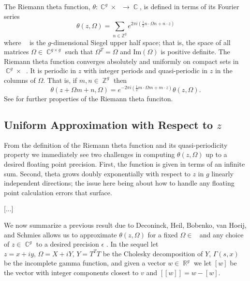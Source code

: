 \documentclass[12]{article}
\DeclareMathOperator{\ZZ}{\mathbb{Z}}
\DeclareMathOperator{\RR}{\mathbb{R}}
\DeclareMathOperator{\CC}{\mathbb{C}}
\DeclareMathOperator{\hg}{\mathfrak{h}_g}
\begin{document}
The Riemann theta function, $\theta : \CC^g \times \hg \to \CC$, is defined in
terms of its Fourier series
\[
  \theta(z,\Omega) = \sum_{n \in \mathbb{Z}^g}
  e^{2\pi i \left( \tfrac{1}{2} n \cdot \Omega n + n \cdot z \right)}
\]
where $\hg$ is the $g$-dimensional Siegel upper half space; that is, the space
of all matrices $\Omega \in \CC^{g \times g}$ such that $\Omega^T = \Omega$ and
$\text{Im}(\Omega)$ is positive definite. The Riemann theta function converges
absolutely and uniformly on compact sets in $\CC^g \times \hg$. It is periodic
in $z$ with integer periods and quasi-periodic in $z$ in the columns of
$\Omega$. That is, if $m,n \in \ZZ^g$ then
\[
  \theta(z + \Omega m + n, \Omega) = e^{-2\pi i \left( \tfrac{1}{2} m
    \cdot \Omega m + m \cdot z \right)} \theta(z,\Omega).
\]
See \cite{DLMF,MumfordI07,MumfordII07} for further properties of the Riemann
theta funciton.

\subsection{Uniform Approximation with Respect to $z$}

From the definition of the Riemann theta function and its quasi-periodicity
property we immediately see two challenges in computing $\theta(z,\Omega)$ up
to a desired floating point precision. First, the function is given in terms of
an infinite sum. Second, theta grows doubly exponentially with respect to $z$
in $g$ linearly independent directions; the issue here being about how to
handle any floating point calculation errors that surface.

[...]

We now summarize a previous result due to Deconinck, Heil, Bobenko, van Hoeij,
and Schmies allows us to approximate $\theta(z,\Omega)$ for a fixed $\Omega \in
\hg$ and any choice of $z \in \CC^g$ to a desired precision $\epsilon$
\cite{Bernard}. In the sequel let $z=x + iy, \, \Omega = X + iY, \, Y = T^TT$
be the Cholesky decomposition of $Y$, $\Gamma(s,x)$ be the incomplete gamma
function, and given a vector $w \in \RR^g$ we let $[w]$ be the vector with
integer components closest to $v$ and $[[w]] = w - [w]$.
\end{document}
